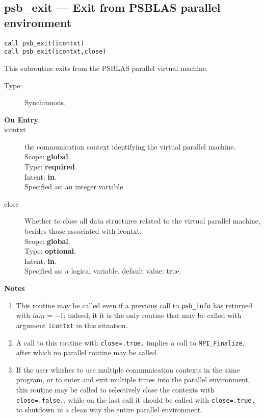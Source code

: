 \clearpage\subsection*{psb\_exit --- Exit from  PSBLAS parallel environment}

\begin{verbatim}
call psb_exit(icontxt)
call psb_exit(icontxt,close)
\end{verbatim}

This subroutine exits from the  PSBLAS parallel virtual  machine.
\begin{description}
\item[Type:] Synchronous.
\item[\bf  On Entry ]
\item[icontxt] the communication context identifying the virtual
  parallel machine.\\
Scope: {\bf global}.\\
Type: {\bf required}.\\
Intent: {\bf in}.\\
Specified as: an integer variable.
\item[close] Whether to close all data structures related to the
  virtual parallel machine, besides those associated with icontxt.\\
Scope: {\bf global}.\\
Type: {\bf optional}.\\
Intent: {\bf in}.\\
Specified as: a logical  variable, default value: true.
\end{description}

{\par\noindent\large\bfseries Notes}
\begin{enumerate}
\item This routine may be called even if a previous call to
  \verb|psb_info| has returned with $iam=-1$; indeed, it it is the only
  routine that may be called with argument \verb|icontxt| in this
  situation.
\item A call to this routine with \verb|close=.true.| implies a call
  to \verb|MPI_Finalize|, after which no parallel routine may be called.
\item If the user whishes to use multiple communication contexts in the
  same program, or to enter and exit multiple times into the parallel
  environment, this routine may be called to 
  selectively close the contexts with \verb|close=.false.|, while on
  the last call it should be called with \verb|close=.true.| to
  shutdown in a clean way the entire parallel environment.
\end{enumerate}


